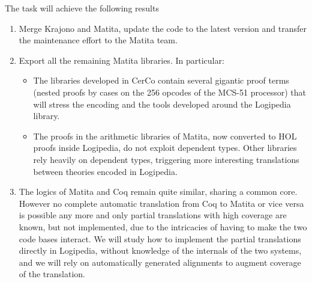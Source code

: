 The task will achieve the following results
\begin{enumerate}
\item Merge Krajono and Matita, update the code to the latest version and transfer the maintenance effort to the Matita team.
\item Export all the remaining Matita libraries. In particular:
\begin{itemize}
 \item The libraries developed in CerCo contain several gigantic proof terms (nested proofs by cases on the 256 opcodes of the MCS-51 processor) that will stress the encoding and the tools developed around the Logipedia library.
 \item The proofs in the arithmetic libraries of Matita, now converted to HOL proofs inside Logipedia, do not exploit dependent types. Other libraries rely heavily on dependent types, triggering more interesting translations between theories encoded in Logipedia.
\end{itemize}
\item The logics of Matita and Coq remain quite similar, sharing a common core. However no complete automatic translation from Coq to Matita or vice versa is possible any more and only partial translations with high coverage are known, but not implemented, due to the intricacies of having to make the two code bases interact. We will study how to implement the partial translations directly in Logipedia, without knowledge of the internals of the two systems, and we will rely on automatically generated alignments to augment coverage of the translation.
\end{enumerate}

